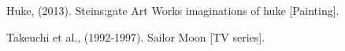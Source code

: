 \documentclass[letterpaper, 16pt]{article}
\begin{document}
\begin{figure}[H]
    \centering
    \caption*{Huke, (2013). Steins;gate Art Works imaginations of huke [Painting].}
    \label{fig:sailor}
\end{figure}

\begin{figure}[H]
    \centering
    \caption*{Takeuchi et al., (1992-1997). Sailor Moon [TV series].}
    \label{fig:sailor}
\end{figure}
\end{document}
